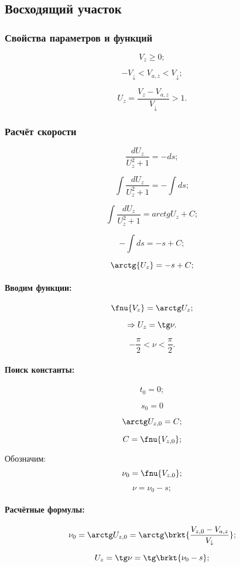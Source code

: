 \subsection{Восходящий участок}
\subsubsection{Свойства параметров и функций}
$$ V_z \geq 0; $$

$$-V_\downarrow < V_{a,z} < V_\downarrow;$$

$$U_z = \frac{V_z - V_{a,z}}{V_\downarrow} >1.$$

\subsubsection{Расчёт скорости}

$$\frac{dU_z}{ U_{z}^2 + 1} = - ds;$$

$$\int \frac{dU_z}{ U_{z}^2 + 1} = -\int ds;$$

$$\int \frac{dU_z}{ U_{z}^2 + 1} = arctg U_z + C;$$

$$-\int ds = - s + C;$$

$$\arctg{U_z} = - s + C;$$

\paragraph{Вводим функции:}
$$\fnu{V_z} = \arctg U_z;$$

$$\Rightarrow U_z = \tg \nu.$$

$$- \frac{\pi}{2} < \nu < \frac{\pi}{2}.$$

\paragraph{Поиск константы:}

$$t_0=0;$$

$$s_0=0$$

$$\arctg U_{z,0} = C;$$

$$C = \fnu{V_{z,0}};$$

Обозначим:
$$\nu_{0} = \fnu{V_{z,0}};$$

$$\nu = \nu_{0} - s;$$

\paragraph{Расчётные формулы:}
$$\nu_{0} = \arctg U_{z,0} = \arctg \brkt{ \frac{V_{z,0} - V_{a,z}}{V_{\downarrow}} };$$

$$U_z = \tg \nu = \tg \brkt{ \nu_{0} - s };$$

